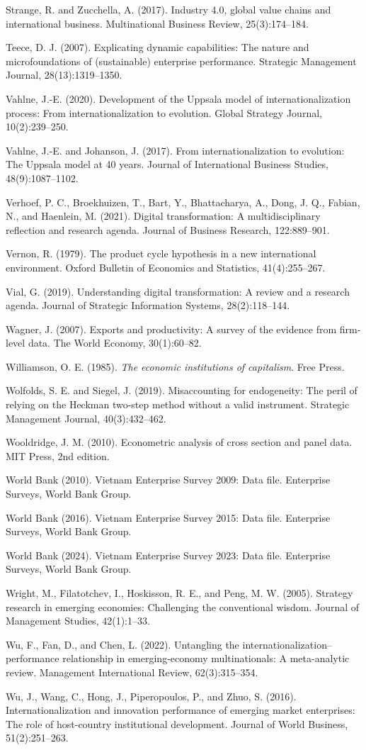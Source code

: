 \documentclass[12pt,a4paper]{article}
\begin{document}
Strange, R. and Zucchella, A. (2017). Industry 4.0, global value chains
and international business. Multinational Business Review,
25(3):174--184.

Teece, D. J. (2007). Explicating dynamic capabilities: The nature and
microfoundations of (sustainable) enterprise performance. Strategic
Management Journal, 28(13):1319--1350.

Vahlne, J.-E. (2020). Development of the Uppsala model of
internationalization process: From internationalization to evolution.
Global Strategy Journal, 10(2):239--250.

Vahlne, J.-E. and Johanson, J. (2017). From internationalization to
evolution: The Uppsala model at 40 years. Journal of International
Business Studies, 48(9):1087--1102.

Verhoef, P. C., Broekhuizen, T., Bart, Y., Bhattacharya, A., Dong, J.
Q., Fabian, N., and Haenlein, M. (2021). Digital transformation: A
multidisciplinary reflection and research agenda. Journal of Business
Research, 122:889--901.

Vernon, R. (1979). The product cycle hypothesis in a new international
environment. Oxford Bulletin of Economics and Statistics,
41(4):255--267.

Vial, G. (2019). Understanding digital transformation: A review and a
research agenda. Journal of Strategic Information Systems,
28(2):118--144.

Wagner, J. (2007). Exports and productivity: A survey of the evidence
from firm-level data. The World Economy, 30(1):60--82.

Williamson, O. E. (1985). \emph{The economic institutions of
capitalism}. Free Press.

Wolfolds, S. E. and Siegel, J. (2019). Misaccounting for endogeneity:
The peril of relying on the Heckman two-step method without a valid
instrument. Strategic Management Journal, 40(3):432--462.

Wooldridge, J. M. (2010). Econometric analysis of cross section and
panel data. MIT Press, 2nd edition.

World Bank (2010). Vietnam Enterprise Survey 2009: Data file. Enterprise
Surveys, World Bank Group.

World Bank (2016). Vietnam Enterprise Survey 2015: Data file. Enterprise
Surveys, World Bank Group.

World Bank (2024). Vietnam Enterprise Survey 2023: Data file. Enterprise
Surveys, World Bank Group.

Wright, M., Filatotchev, I., Hoskisson, R. E., and Peng, M. W. (2005).
Strategy research in emerging economies: Challenging the conventional
wisdom. Journal of Management Studies, 42(1):1--33.

Wu, F., Fan, D., and Chen, L. (2022). Untangling the
internationalization--performance relationship in emerging-economy
multinationals: A meta-analytic review. Management International Review,
62(3):315--354.

Wu, J., Wang, C., Hong, J., Piperopoulos, P., and Zhuo, S. (2016).
Internationalization and innovation performance of emerging market
enterprises: The role of host-country institutional development. Journal
of World Business, 51(2):251--263.
\end{document}
